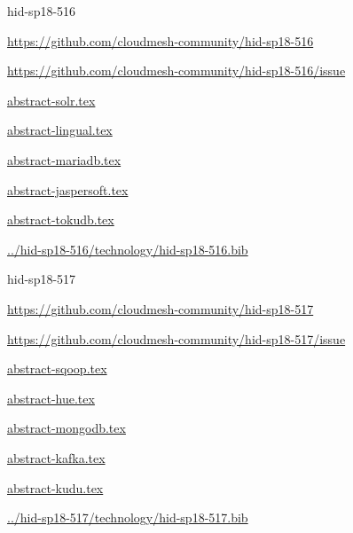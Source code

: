 \begin{IU}

hid-sp18-516

\url{https://github.com/cloudmesh-community/hid-sp18-516}

\url{https://github.com/cloudmesh-community/hid-sp18-516/issue}

\href{https://github.com/cloudmesh-community/hid-sp18-516/blob/master//technology/abstract-solr.tex}{abstract-solr.tex}

\href{https://github.com/cloudmesh-community/hid-sp18-516/blob/master//technology/abstract-lingual.tex}{abstract-lingual.tex}

\href{https://github.com/cloudmesh-community/hid-sp18-516/blob/master//technology/abstract-mariadb.tex}{abstract-mariadb.tex}

\href{https://github.com/cloudmesh-community/hid-sp18-516/blob/master//technology/abstract-jaspersoft.tex}{abstract-jaspersoft.tex}

\href{https://github.com/cloudmesh-community/hid-sp18-516/blob/master//technology/abstract-tokudb.tex}{abstract-tokudb.tex}

\href{https://github.com/cloudmesh-community/hid-sp18-516/blob/master//technology/hid-sp18-516.bib}{../hid-sp18-516/technology/hid-sp18-516.bib}

\end{IU}


\begin{IU}

hid-sp18-517

\url{https://github.com/cloudmesh-community/hid-sp18-517}

\url{https://github.com/cloudmesh-community/hid-sp18-517/issue}

\href{https://github.com/cloudmesh-community/hid-sp18-517/blob/master//technology/abstract-sqoop.tex}{abstract-sqoop.tex}

\href{https://github.com/cloudmesh-community/hid-sp18-517/blob/master//technology/abstract-hue.tex}{abstract-hue.tex}

\href{https://github.com/cloudmesh-community/hid-sp18-517/blob/master//technology/abstract-mongodb.tex}{abstract-mongodb.tex}

\href{https://github.com/cloudmesh-community/hid-sp18-517/blob/master//technology/abstract-kafka.tex}{abstract-kafka.tex}

\href{https://github.com/cloudmesh-community/hid-sp18-517/blob/master//technology/abstract-kudu.tex}{abstract-kudu.tex}

\href{https://github.com/cloudmesh-community/hid-sp18-517/blob/master//technology/hid-sp18-517.bib}{../hid-sp18-517/technology/hid-sp18-517.bib}

\end{IU}


